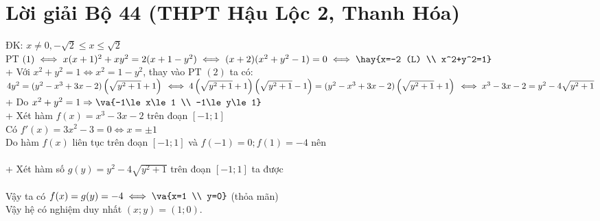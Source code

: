 \section{Lời giải Bộ 44 (THPT Hậu Lộc 2, Thanh Hóa)}

\lgi 
\vspace{5cm}

\hda 
ĐK: $x\ne 0,-\sqrt{2}\le x\le \sqrt{2}$\\
PT $(1)\iff x(x+1)^2+xy^2=2(x+1-y^2)\\
\iff (x+2)(x^2+y^2-1)=0\\
\iff \hay{x=-2 (L) \\ x^2+y^2=1}$\\
+ Với $x^2+y^2=1\iff x^2=1-y^2$, thay vào PT $(2)$ ta có:\\
$4y^2=(y^2-x^3+3x-2)\left(\sqrt{y^2+1}+1\right)\\
\iff 4\left(\sqrt{y^2+1}+1\right)\left(\sqrt{y^2+1}-1\right)=(y^2-x^3+3x-2)\left(\sqrt{y^2+1}+1\right)\\
\iff x^3-3x-2=y^2-4\sqrt{y^2+1}$\\
+ Do $x^2+y^2=1\Rightarrow \va{-1\le x\le 1 \\ -1\le y\le 1}$\\
+ Xét hàm $f(x)=x^3-3x-2$ trên đoạn $[-1;1]$\\
Có $f'(x)=3x^2-3=0\iff x=\pm 1$\\
Do hàm $f(x)$ liên tục trên đoạn $[-1;1]$ và $f(-1)=0;f(1)=-4$ nên\\
\\
+ Xét hàm số $g(y)=y^2-4\sqrt{y^2+1}$ trên đoạn $[-1;1]$ ta được \\
\\
Vậy ta có $f(x)=g(y)=-4\iff \va{x=1 \\ y=0}$ (thỏa mãn)\\
Vậy hệ có nghiệm duy nhất $(x;y)=(1;0)$.
